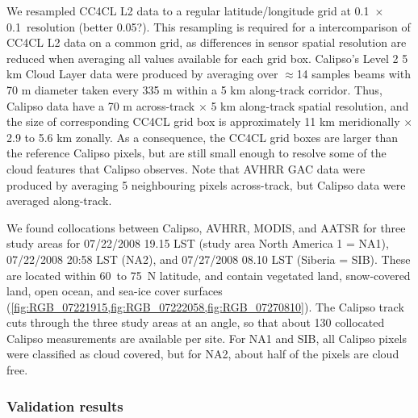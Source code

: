 We resampled CC4CL L2 data to a regular latitude/longitude grid at 0.1\textdegree\ $\times$ 0.1\textdegree\ resolution (better 0.05?). This resampling is required for a intercomparison of CC4CL L2 data on a common grid, as differences in sensor spatial resolution are reduced when averaging all values available for each grid box. Calipso's Level 2 5 km Cloud Layer data were produced by averaging over $\approx$14 samples beams with 70 m diameter taken every 335 m within a 5 km along-track corridor. Thus, Calipso data have a 70 m across-track $\times$ 5 km along-track spatial resolution, and the size of corresponding CC4CL grid box is approximately 11 km meridionally $\times$ 2.9 to 5.6 km zonally. As a consequence, the CC4CL grid boxes are larger than the reference Calipso pixels, but are still small enough to resolve some of the cloud features that Calipso observes. Note that AVHRR GAC data were produced by averaging 5 neighbouring pixels across-track, but Calipso data were averaged along-track.
 
We found collocations between Calipso, AVHRR, MODIS, and AATSR for three study areas for 07/22/2008 19.15 LST (study area North America 1 = NA1), 07/22/2008 20:58 LST (NA2), and 07/27/2008 08.10 LST (Siberia = SIB). These are located within 60\textdegree\ to 75\textdegree\ N latitude, and contain vegetated land, snow-covered land, open ocean, and sea-ice cover surfaces (\cref{fig:RGB_07221915,fig:RGB_07222058,fig:RGB_07270810}). The Calipso track cuts through the three study areas at an angle, so that about 130 collocated Calipso measurements are available per site. For NA1 and SIB, all Calipso pixels were classified as cloud covered, but for NA2, about half of the pixels are cloud free.

\subsubsection{Validation results}


